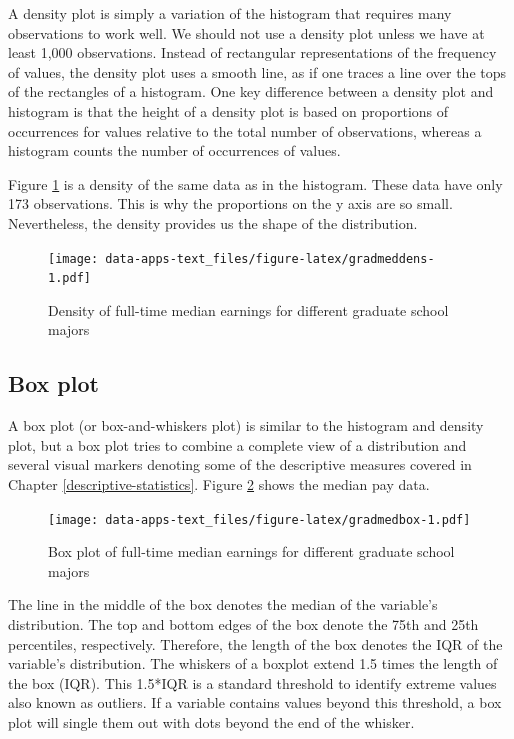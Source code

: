 \documentclass[
]{book}
\begin{document}
A density plot is simply a variation of the histogram that requires many observations to work well. We should not use a density plot unless we have at least 1,000 observations. Instead of rectangular representations of the frequency of values, the density plot uses a smooth line, as if one traces a line over the tops of the rectangles of a histogram. One key difference between a density plot and histogram is that the height of a density plot is based on proportions of occurrences for values relative to the total number of observations, whereas a histogram counts the number of occurrences of values.

Figure \ref{fig:gradmeddens} is a density of the same data as in the histogram. These data have only 173 observations. This is why the proportions on the y axis are so small. Nevertheless, the density provides us the shape of the distribution.

\begin{figure}
\centering
\texttt{[image: data-apps-text\_files/figure-latex/gradmeddens-1.pdf]}
\caption{\label{fig:gradmeddens}Density of full-time median earnings for different graduate school majors}
\end{figure}

\hypertarget{box-plot}{%
\subsection{Box plot}\label{box-plot}}

A box plot (or box-and-whiskers plot) is similar to the histogram and density plot, but a box plot tries to combine a complete view of a distribution and several visual markers denoting some of the descriptive measures covered in Chapter \ref{descriptive-statistics}. Figure \ref{fig:gradmedbox} shows the median pay data.

\begin{figure}
\centering
\texttt{[image: data-apps-text\_files/figure-latex/gradmedbox-1.pdf]}
\caption{\label{fig:gradmedbox}Box plot of full-time median earnings for different graduate school majors}
\end{figure}

The line in the middle of the box denotes the median of the variable's distribution. The top and bottom edges of the box denote the 75th and 25th percentiles, respectively. Therefore, the length of the box denotes the IQR of the variable's distribution. The whiskers of a boxplot extend 1.5 times the length of the box (IQR). This 1.5*IQR is a standard threshold to identify extreme values also known as outliers. If a variable contains values beyond this threshold, a box plot will single them out with dots beyond the end of the whisker.
\end{document}
